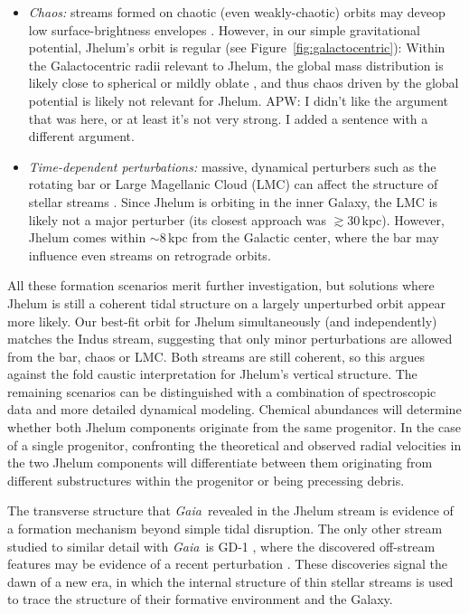 \documentclass[twocolumn]{aastex62}
\newcommand{\gaia}{\textsl{Gaia}}
\newcommand{\apw}[1]{{\color{blue} APW: #1}}
\begin{document}
\begin{itemize}
{ }
 \item{\emph{Chaos:} streams formed on chaotic (even weakly-chaotic) orbits may deveop low surface-brightness envelopes \citep[e.g.,][]{pw2016}.
 However, in our simple gravitational potential, Jhelum's orbit is regular (see Figure~\ref{fig:galactocentric}):
 Within the Galactocentric radii relevant to Jhelum, the global mass distribution is likely close to spherical or mildly oblate \citep[e.g.,][]{kupper2015}, and thus chaos driven by the global potential is likely not relevant for Jhelum.
 \apw{I didn't like the argument that was here, or at least it's not very strong. I added a sentence with a different argument.}
 }
 \item{\emph{Time-dependent perturbations:} massive, dynamical perturbers such as the rotating bar or Large Magellanic Cloud (LMC) can affect the structure of stellar streams \citep[e.g.,][]{pw2016b, pearson2017, erkal2019}.
 Since Jhelum is orbiting in the inner Galaxy, the LMC is likely not a major perturber (its closest approach was $\gtrsim30$\,kpc).
 However, Jhelum comes within $\sim8\,$kpc from the Galactic center, where the bar may influence even streams on retrograde orbits.
 }
\end{itemize}

All these formation scenarios merit further investigation, but solutions where Jhelum is still a coherent tidal structure on a largely unperturbed orbit appear more likely.
Our best-fit orbit for Jhelum simultaneously (and independently) matches the Indus stream, suggesting that only minor perturbations are allowed from the bar, chaos or LMC.
Both streams are still coherent, so this argues against the fold caustic interpretation for Jhelum's vertical structure.
The remaining scenarios can be distinguished with a combination of spectroscopic data and more detailed dynamical modeling.
Chemical abundances will determine whether both Jhelum components originate from the same progenitor.
In the case of a single progenitor, confronting the theoretical and observed radial velocities in the two Jhelum components will differentiate between them originating from different substructures within the progenitor or being precessing debris.

The transverse structure that \gaia\ revealed in the Jhelum stream is evidence of a formation mechanism beyond simple tidal disruption.
The only other stream studied to similar detail with \gaia\ is GD-1 \citep{pwb}, where the discovered off-stream features may be evidence of a recent perturbation \citep{bonaca2018}.
These discoveries signal the dawn of a new era, in which the internal structure of thin stellar streams is used to trace the structure of their formative environment and the Galaxy.
\end{document}
